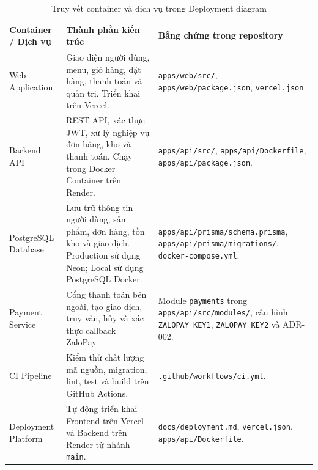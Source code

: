 \begin{table}[H]
\centering
\small
\caption{Truy vết container và dịch vụ trong Deployment diagram}
\label{tabB:deploy-trace}
\begin{tabularx}{\textwidth}{@{}p{2.3cm} X X@{}}
\toprule
\textbf{Container / Dịch vụ} &
\textbf{Thành phần kiến trúc} &
\textbf{Bằng chứng trong repository} \\
\midrule

Web Application &
Giao diện người dùng, menu, giỏ hàng, đặt hàng, thanh toán và quản trị. Triển khai trên Vercel. &
\texttt{apps/web/src/}, \texttt{apps/web/package.json}, \texttt{vercel.json}. \\

Backend API &
REST API, xác thực JWT, xử lý nghiệp vụ đơn hàng, kho và thanh toán. Chạy trong Docker Container trên Render. &
\texttt{apps/api/src/}, \texttt{apps/api/Dockerfile}, \texttt{apps/api/package.json}. \\

PostgreSQL Database &
Lưu trữ thông tin người dùng, sản phẩm, đơn hàng, tồn kho và giao dịch. Production sử dụng Neon; Local sử dụng PostgreSQL Docker. &
\texttt{apps/api/prisma/schema.prisma}, \texttt{apps/api/prisma/migrations/}, \texttt{docker-compose.yml}. \\

Payment Service &
Cổng thanh toán bên ngoài, tạo giao dịch, truy vấn, hủy và xác thực callback ZaloPay. &
Module \texttt{payments} trong \texttt{apps/api/src/modules/}, cấu hình \texttt{ZALOPAY\_KEY1}, \texttt{ZALOPAY\_KEY2} và ADR-002. \\

CI Pipeline &
Kiểm thử chất lượng mã nguồn, migration, lint, test và build trên GitHub Actions. &
\texttt{.github/workflows/ci.yml}. \\

Deployment Platform &
Tự động triển khai Frontend trên Vercel và Backend trên Render từ nhánh \texttt{main}. &
\texttt{docs/deployment.md}, \texttt{vercel.json}, \texttt{apps/api/Dockerfile}. \\

\bottomrule
\end{tabularx}
\end{table}
